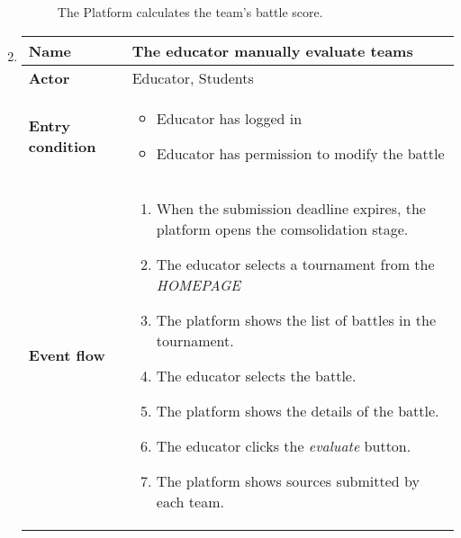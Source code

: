 \begin{enumerate}[label=\textbf{UC\arabic*}:,leftmargin=1.3cm]
            \begin{figure}[H]
                  \centering
                  \caption{The Platform calculates the team's battle score.}
                  \label{fig:Student makes a new push}
            \end{figure}
            \pagebreak
      \item \textbf{}
            \begin{table}[H]
                  \centering
                  \begin{tabular}{|l|p{11.9cm}|}
                        \hline
                        \textbf{Name}            & The educator manually evaluate teams                                        \\\hline
                        \textbf{Actor}           & Educator, Students                                                          \\\hline
                        \textbf{Entry condition} &
                        \begin{itemize}
                              \item Educator has logged in
                              \item Educator has permission to modify the battle
                        \end{itemize}                                                      \\\hline
                        \textbf{Event flow}      &
                        \begin{enumerate}[label=\arabic*.]
                              \item When the submission deadline expires, the platform opens the comsolidation stage.
                              \item The educator selects a tournament from the \emph{HOMEPAGE}
                              \item The platform shows the list of battles in the tournament.
                              \item The educator selects the battle.
                              \item The platform shows the details of the battle.
                              \item The educator clicks the \emph{evaluate} button.
                              \item The platform shows sources submitted by each team.

\end{enumerate}
\end{tabular}
\end{table}
\end{enumerate}
